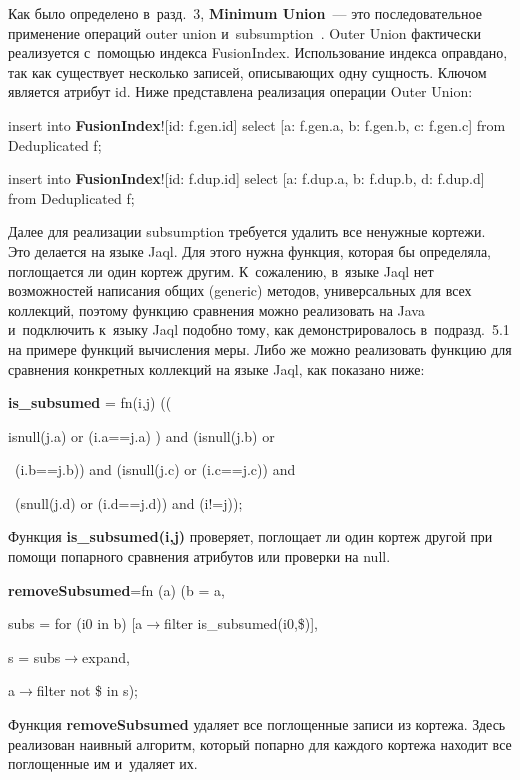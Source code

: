 \begin{multicols}{2}
  Как было определено в~разд.~3, \textbf{Minimum Union}~--- это
последовательное применение операций {\sf outer union}
и~{\sf subsumption}~\cite{11-vov}. {\sf Outer
Union} фактически реализуется с~помощью индекса {\sf FusionIndex}. Использование индекса
оправдано, так как существует несколько записей, описывающих одну сущность. Ключом
является атрибут id. Ниже представлена реализация операции {\sf Outer Union}:

{\sf
\noindent
  insert into {\textbf{FusionIndex}}![id: f.gen.id] select [a: f.gen.a, b:
f.gen.b, c: f.gen.c] from Deduplicated f;

  \vspace*{6pt}

\noindent
  insert into {\textbf{FusionIndex}}![id: f.dup.id] select [a: f.dup.a, b: f.dup.b, d:
f.dup.d] from Deduplicated f;
}

  Далее для реализации subsumption требуется удалить все ненужные кортежи. Это делается
на языке Jaql. Для этого нужна функция, которая бы определяла, поглощается ли один
кортеж другим. К~сожалению, в~языке Jaql нет возможностей написания общих (generic)
методов, универсальных для всех коллекций, поэтому функцию сравнения можно
реализовать на Java и~подключить к~языку Jaql подобно тому, как демонстрировалось
в~подразд.~5.1 на примере функций вычисления меры. Либо же можно реализовать функцию
для сравнения конкретных коллекций на языке Jaql, как показано ниже:

{\sf
 \noindent
{\textbf{is\_subsumed}} = fn(i,j) ((


 \noindent isnull(j.a) or (i.a\;==\;j.a) ) and (isnull(j.b) or

 \noindent
 \ (i.b\;==\;j.b))  and (isnull(j.c) or (i.c\;==\;j.c)) and

 \noindent
 \ (snull(j.d) or (i.d\;==\;j.d)) and (i!\;=\;j));
  }

  Функция \textbf{is\_subsumed(i,j)} проверяет, поглощает ли один кортеж другой
при помощи попарного сравнения атрибутов или проверки на null.

{\sf \noindent
{\textbf{removeSubsumed}}\;=\;fn (a) (b = a,

\noindent
  subs = for (i0 in b) [a\;$\to$\;filter is\_subsumed(i0,\$)],

  s = subs\;$\to$\;expand,

\noindent
  a\;$\to$\;filter not \$ in s);
}

  Функция \textbf{removeSubsumed} удаляет все поглощенные записи из кортежа. Здесь
реализован наивный алгоритм, который попарно для каждого кортежа находит все
поглощенные им и~удаляет их.


\end{multicols}
